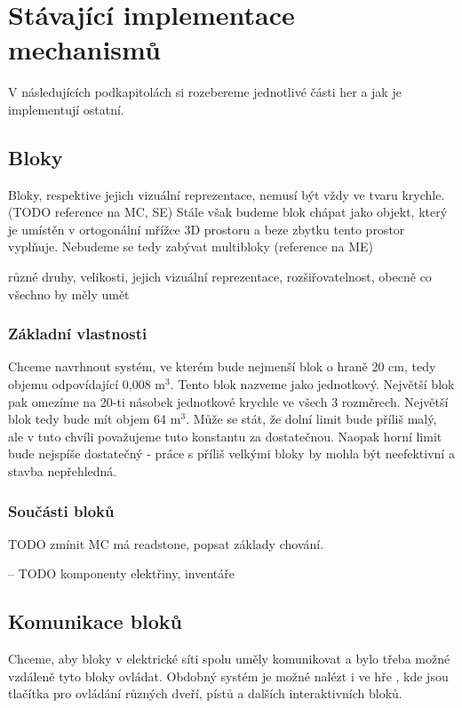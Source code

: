 

\section{Stávající implementace mechanismů}

V následujících podkapitolách si rozebereme jednotlivé části her a jak je implementují ostatní.

\subsection{Bloky}

Bloky, respektive jejich vizuální reprezentace, nemusí být vždy ve tvaru krychle. (TODO reference na MC, SE) Stále však budeme blok chápat jako objekt, který je umístěn v ortogonální mřížce 3D prostoru a beze zbytku tento prostor vyplňuje. Nebudeme se tedy zabývat multibloky (reference na ME)

různé druhy, velikosti, jejich vizuální reprezentace, rozšiřovatelnost, obecně co všechno by měly umět

\subsubsection{Základní vlastnosti}
Chceme navrhnout systém, ve kterém bude nejmenší blok o hraně 20 cm, tedy objemu odpovídající 0,008 m$^3$. Tento blok nazveme jako jednotkový. Největší blok pak omezíme na 20-ti násobek jednotkové krychle ve všech 3 rozměrech. Největší blok tedy bude mít objem 64 m$^3$. Může se stát, že dolní limit bude příliš malý, ale v tuto chvíli považujeme tuto konstantu za dostatečnou. Naopak horní limit bude nejspíše dostatečný - práce s příliš velkými bloky by mohla být neefektivní a stavba nepřehledná.

\subsubsection{Součásti bloků}
TODO zmínit MC má readstone, popsat základy chování.



-- TODO komponenty elektřiny, inventáře

\subsection{Komunikace bloků}

Chceme, aby bloky v elektrické síti spolu uměly komunikovat a bylo třeba možné vzdáleně tyto bloky ovládat. Obdobný systém je možné nalézt i ve hře \SE{}, kde jsou tlačítka pro ovládání různých dveří, pístů a dalších interaktivních bloků.

